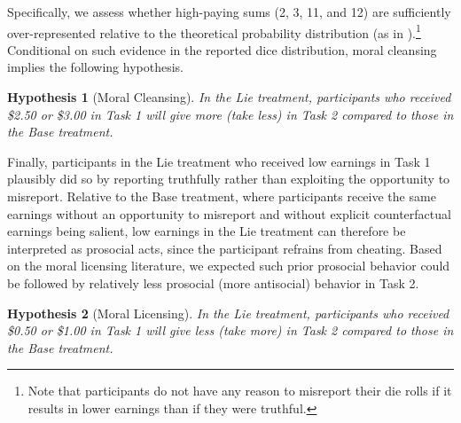 \documentclass{article}
\newtheorem{hypothesis}{Hypothesis}
\begin{document}
Specifically, we assess whether high-paying sums (2, 3, 11, and 12) are sufficiently over-represented relative to the theoretical probability distribution (as in \cite{Fischbacher2013}).\footnote{Note that participants do not have any reason to misreport their die rolls if it results in lower earnings than if they were truthful.} Conditional on such evidence in the reported dice distribution, moral cleansing implies the following hypothesis.
\begin{hypothesis}[Moral Cleansing]
In the Lie treatment, participants who received \$2.50 or \$3.00 in Task 1 will give more (take less) in Task 2 compared to those in the Base treatment.
\end{hypothesis} \noindent
Finally, participants in the Lie treatment who received low earnings in Task 1 plausibly did so by reporting truthfully rather than exploiting the opportunity to misreport. Relative to the Base treatment, where participants receive the same earnings without an opportunity to misreport and without explicit counterfactual earnings being salient, low earnings in the Lie treatment can therefore be interpreted as prosocial acts, since the participant refrains from cheating. Based on the moral licensing literature, we expected such prior prosocial behavior could be followed by relatively less prosocial (more antisocial) behavior in Task 2.
\begin{hypothesis}[Moral Licensing]
In the Lie treatment, participants who received \$0.50 or \$1.00 in Task 1 will give less (take more) in Task 2 compared to those in the Base treatment.
\end{hypothesis} \noindent
\par
\end{document}
